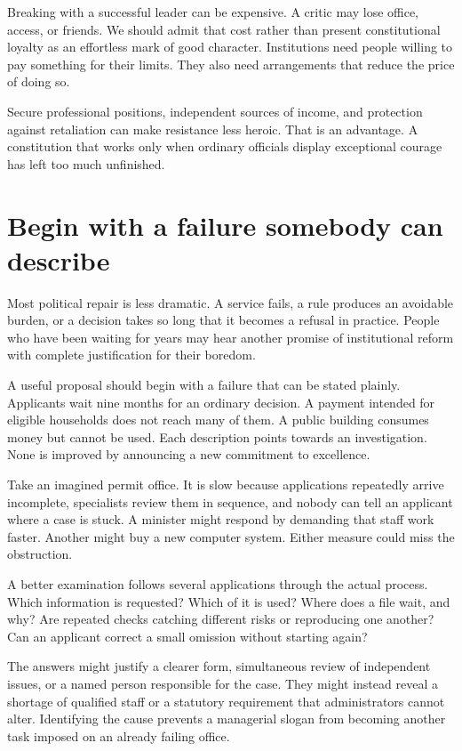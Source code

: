 \documentclass[12pt,a4paper]{book}
\begin{document}
Breaking with a successful leader can be expensive. A critic may lose office, access, or friends. We should admit that cost rather than present constitutional loyalty as an effortless mark of good character. Institutions need people willing to pay something for their limits. They also need arrangements that reduce the price of doing so.

Secure professional positions, independent sources of income, and protection against retaliation can make resistance less heroic. That is an advantage. A constitution that works only when ordinary officials display exceptional courage has left too much unfinished.

\section*{Begin with a failure somebody can describe}

Most political repair is less dramatic. A service fails, a rule produces an avoidable burden, or a decision takes so long that it becomes a refusal in practice. People who have been waiting for years may hear another promise of institutional reform with complete justification for their boredom.

A useful proposal should begin with a failure that can be stated plainly. Applicants wait nine months for an ordinary decision. A payment intended for eligible households does not reach many of them. A public building consumes money but cannot be used. Each description points towards an investigation. None is improved by announcing a new commitment to excellence.

Take an imagined permit office. It is slow because applications repeatedly arrive incomplete, specialists review them in sequence, and nobody can tell an applicant where a case is stuck. A minister might respond by demanding that staff work faster. Another might buy a new computer system. Either measure could miss the obstruction.

A better examination follows several applications through the actual process. Which information is requested? Which of it is used? Where does a file wait, and why? Are repeated checks catching different risks or reproducing one another? Can an applicant correct a small omission without starting again?

The answers might justify a clearer form, simultaneous review of independent issues, or a named person responsible for the case. They might instead reveal a shortage of qualified staff or a statutory requirement that administrators cannot alter. Identifying the cause prevents a managerial slogan from becoming another task imposed on an already failing office.
\end{document}
